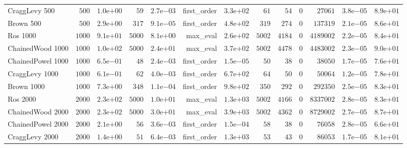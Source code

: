 \begin{longtable}[c]{lrrrrrrrrrrrr}
CraggLevy 500 & \(  500\) & \( 1.0\)e\(+00\) & \(   59\) & \( 2.7\)e\(-03\) & first\_order & \( 3.3\)e\(+02\) & \(   61\) & \(   54\) & \(    0\) & \(27061\) & \( 3.8\)e\(-05\) & \( 8.9\)e\(+01\) \\
Brown 500 & \(  500\) & \( 2.9\)e\(+00\) & \(  317\) & \( 9.1\)e\(-05\) & first\_order & \( 4.8\)e\(+02\) & \(  319\) & \(  274\) & \(    0\) & \(137319\) & \( 2.1\)e\(-05\) & \( 8.6\)e\(+01\) \\
Ros 1000 & \( 1000\) & \( 9.1\)e\(+01\) & \( 5000\) & \( 8.1\)e\(+00\) & max\_eval & \( 2.6\)e\(+02\) & \( 5002\) & \( 4184\) & \(    0\) & \(4189002\) & \( 2.2\)e\(-05\) & \( 8.4\)e\(+01\) \\
ChainedWood 1000 & \( 1000\) & \( 1.0\)e\(+02\) & \( 5000\) & \( 2.4\)e\(+01\) & max\_eval & \( 3.7\)e\(+02\) & \( 5002\) & \( 4478\) & \(    0\) & \(4483002\) & \( 2.3\)e\(-05\) & \( 9.0\)e\(+01\) \\
ChainedPowel 1000 & \( 1000\) & \( 6.5\)e\(-01\) & \(   48\) & \( 2.4\)e\(-03\) & first\_order & \( 1.5\)e\(-05\) & \(   50\) & \(   38\) & \(    0\) & \(38050\) & \( 1.7\)e\(-05\) & \( 7.6\)e\(+01\) \\
CraggLevy 1000 & \( 1000\) & \( 6.1\)e\(-01\) & \(   62\) & \( 4.0\)e\(-03\) & first\_order & \( 6.7\)e\(+02\) & \(   64\) & \(   50\) & \(    0\) & \(50064\) & \( 1.2\)e\(-05\) & \( 7.8\)e\(+01\) \\
Brown 1000 & \( 1000\) & \( 7.3\)e\(+00\) & \(  348\) & \( 1.1\)e\(-04\) & first\_order & \( 9.8\)e\(+02\) & \(  350\) & \(  292\) & \(    0\) & \(292350\) & \( 2.5\)e\(-05\) & \( 8.3\)e\(+01\) \\
Ros 2000 & \( 2000\) & \( 2.3\)e\(+02\) & \( 5000\) & \( 1.0\)e\(+01\) & max\_eval & \( 1.3\)e\(+03\) & \( 5002\) & \( 4166\) & \(    0\) & \(8337002\) & \( 2.8\)e\(-05\) & \( 8.3\)e\(+01\) \\
ChainedWood 2000 & \( 2000\) & \( 2.3\)e\(+02\) & \( 5000\) & \( 3.0\)e\(+01\) & max\_eval & \( 3.9\)e\(+03\) & \( 5002\) & \( 4362\) & \(    0\) & \(8729002\) & \( 2.7\)e\(-05\) & \( 8.7\)e\(+01\) \\
ChainedPowel 2000 & \( 2000\) & \( 2.1\)e\(+00\) & \(   56\) & \( 3.6\)e\(-03\) & first\_order & \( 1.5\)e\(-04\) & \(   58\) & \(   38\) & \(    0\) & \(76058\) & \( 2.8\)e\(-05\) & \( 6.6\)e\(+01\) \\
CraggLevy 2000 & \( 2000\) & \( 1.4\)e\(+00\) & \(   51\) & \( 6.4\)e\(-03\) & first\_order & \( 1.3\)e\(+03\) & \(   53\) & \(   43\) & \(    0\) & \(86053\) & \( 1.7\)e\(-05\) & \( 8.1\)e\(+01\) \\

\end{longtable}
